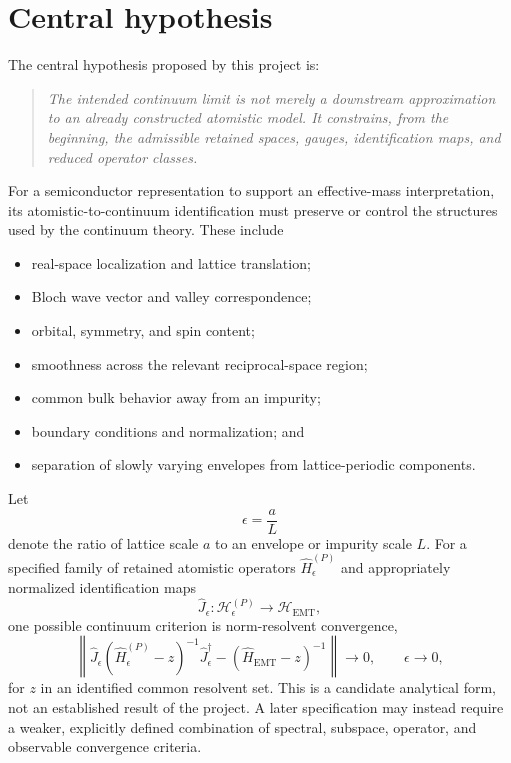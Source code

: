 \section{Central hypothesis}


The central hypothesis proposed by this project is:
\begin{quote}
\itshape
The intended continuum limit is not merely a downstream approximation to an
already constructed atomistic model. It constrains, from the beginning, the
admissible retained spaces, gauges, identification maps, and reduced operator
classes.
\end{quote}

For a semiconductor representation to support an effective-mass
interpretation, its atomistic-to-continuum identification must preserve or
control the structures used by the continuum theory. These include
\begin{itemize}
    \item real-space localization and lattice translation;
    \item Bloch wave vector and valley correspondence;
    \item orbital, symmetry, and spin content;
    \item smoothness across the relevant reciprocal-space region;
    \item common bulk behavior away from an impurity;
    \item boundary conditions and normalization; and
    \item separation of slowly varying envelopes from lattice-periodic
          components.
\end{itemize}

Let
\begin{equation}
    \epsilon=\frac{a}{L}
\end{equation}
denote the ratio of lattice scale $a$ to an envelope or impurity scale $L$.
For a specified family of retained atomistic operators
$\hat H_\epsilon^{(P)}$ and appropriately normalized identification maps
\begin{equation}
    \hat J_\epsilon:
    \mathcal H_\epsilon^{(P)}
    \longrightarrow
    \mathcal H_{\mathrm{EMT}},
\end{equation}
one possible continuum criterion is norm-resolvent convergence,
\begin{equation}
    \left\|
        \hat J_\epsilon
        \left(\hat H_\epsilon^{(P)}-z\right)^{-1}
        \hat J_\epsilon^\dagger
        -
        \left(\hat H_{\mathrm{EMT}}-z\right)^{-1}
    \right\|
    \longrightarrow 0,
    \qquad
    \epsilon\longrightarrow 0,
\end{equation}
for $z$ in an identified common resolvent set. This is a candidate analytical
form, not an established result of the project. A later specification may
instead require a weaker, explicitly defined combination of spectral,
subspace, operator, and observable convergence criteria.

